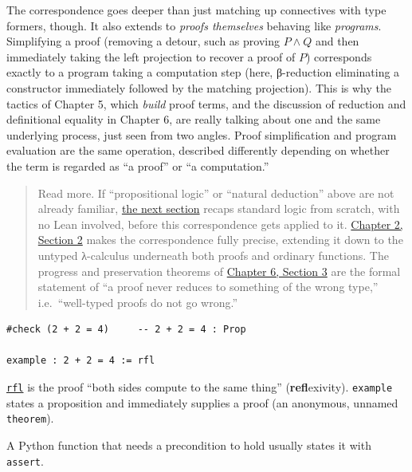 The correspondence goes deeper than just matching up connectives with type formers, though. It also extends to \emph{proofs themselves} behaving like \emph{programs}. Simplifying a proof (removing a detour, such as proving \(P \wedge Q\) and then immediately taking the left projection to recover a proof of \(P\)) corresponds exactly to a program taking a computation step (here, β-reduction eliminating a constructor immediately followed by the matching projection). This is why the tactics of Chapter 5, which \emph{build} proof terms, and the discussion of reduction and definitional equality in Chapter 6, are really talking about one and the same underlying process, just seen from two angles. Proof simplification and program evaluation are the same operation, described differently depending on whether the term is regarded as ``a proof'' or ``a computation.''

\begin{quote}
Read more. If ``propositional logic'' or ``natural deduction'' above are not already familiar, \hyperref[sec:04-propositions-and-proofs:02-logic-recap:1]{the next section} recaps standard logic from scratch, with no Lean involved, before this correspondence gets applied to it. \hyperref[sec:02-terminology-and-coc:02-pi-sigma-and-coc:1]{Chapter 2, Section 2} makes the correspondence fully precise, extending it down to the untyped λ-calculus underneath both proofs and ordinary functions. The progress and preservation theorems of \hyperref[sec:06-rigor-check:03-typing-rules-and-safety:1]{Chapter 6, Section 3} are the formal statement of ``a proof never reduces to something of the wrong type,'' i.e.~``well-typed proofs do not go wrong.''
\end{quote}

\begin{lstlisting}
#check (2 + 2 = 4)     -- 2 + 2 = 4 : Prop

example : 2 + 2 = 4 := rfl
\end{lstlisting}

\href{https://lean-lang.org/doc/reference/latest/Tactic-Proofs/Tactic-Reference/}{\texttt{rfl}} is the proof ``both sides compute to the same thing'' (\textbf{refl}exivity). \texttt{example} states a proposition and immediately supplies a proof (an anonymous, unnamed \texttt{theorem}).

\begin{progcorner}

A Python function that needs a precondition to hold usually states it with \texttt{assert}.

\end{progcorner}


